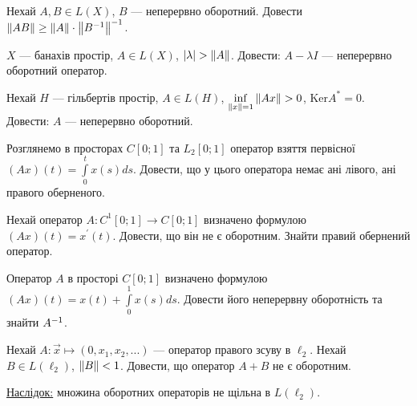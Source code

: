 \begin{exercise}
    Нехай $A, B \in L(X)$, $B$ --- неперервно оборотний.
    Довести $\left\lVert AB\right\rVert \geq \left\lVert A\right\rVert \cdot \left\lVert B^{-1}\right\rVert^{-1}$.
\end{exercise}

\begin{exercise}
    $X$ --- банахів простір, $A \in L(X)$, $\left| \lambda\right| > \left\lVert A\right\rVert$.
    Довести: $A - \lambda I$ --- неперервно оборотний оператор.
\end{exercise}

\begin{exercise}
    Нехай $H$ --- гільбертів простір, $A \in L(H)$, $\underset{\left\lVert x\right\rVert = 1}{\inf} \left\lVert Ax\right\rVert > 0$, $\mathrm{Ker} A^* = {0}$.
    Довести: $A$ --- неперервно оборотний.
\end{exercise}

\begin{exercise}
    Розглянемо в просторах $C[0;1]$ та $L_2 [0;1]$ оператор взяття первісної \\
    $(Ax)(t) = \int\limits_0^t x(s) ds$. Довести, що у цього оператора немає
    ані лівого, ані правого оберненого.
\end{exercise}

\begin{exercise}
    Нехай оператор $A: C^1 [0;1] \to C[0;1]$ визначено формулою $(Ax)(t) = x^\prime(t)$.
    Довести, що він не є оборотним. Знайти правий обернений оператор.
\end{exercise}

\begin{exercise}
    Оператор $A$ в просторі $C[0;1]$ визначено формулою $(Ax)(t) = x(t) + \int\limits_0^1 x(s) ds$.
    Довести його неперервну оборотність та знайти $A^{-1}$.
\end{exercise}

\begin{exercise}
    Нехай $A: \vec{x} \mapsto (0, x_1, x_2, ...)$ --- оператор правого зсуву в $\ell_2$.
    Нехай $B \in L(\ell_2)$, $\left\lVert B\right\rVert < 1$. Довести, що оператор $A+B$ не є оборотним.
\end{exercise}

\begin{theory}
    \ul{Наслідок:} множина оборотних операторів не щільна в $L(\ell_2)$.
\end{theory}
